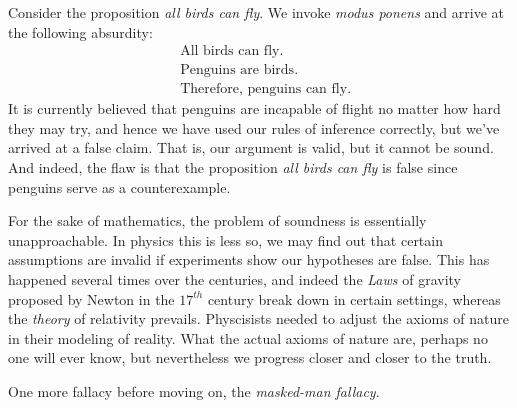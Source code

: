         \begin{example}
            Consider the proposition \textit{all birds can fly}. We invoke
            \textit{modus ponens} and arrive at the following absurdity:
            \begin{subequations}
                \begin{align}
                    &\text{All birds can fly}.\\
                    &\text{Penguins are birds}.\\
                    &\text{Therefore, penguins can fly}.
                \end{align}
            \end{subequations}
            It is currently believed that penguins are incapable of flight no
            matter how hard they may try, and hence we have used our rules of
            inference correctly, but we've arrived at a false claim. That is,
            our argument is valid, but it cannot be sound. And indeed, the flaw
            is that the proposition \textit{all birds can fly} is false since
            penguins serve as a counterexample.
        \end{example}
        For the sake of mathematics, the problem of soundness is essentially
        unapproachable. In physics this is less so, we may find out that certain
        assumptions are invalid if experiments show our hypotheses are false.
        This has happened several times over the centuries, and indeed the
        \textit{Laws} of gravity proposed by Newton in the $17^{th}$ century
        break down in certain settings, whereas the \textit{theory} of
        relativity prevails. Physcisists needed to adjust the axioms of nature
        in their modeling of reality. What the actual axioms of nature are,
        perhaps no one will ever know, but nevertheless we progress closer and
        closer to the truth.
        \par\hfill\par
        One more fallacy before moving on, the
        \textit{masked-man fallacy}.
